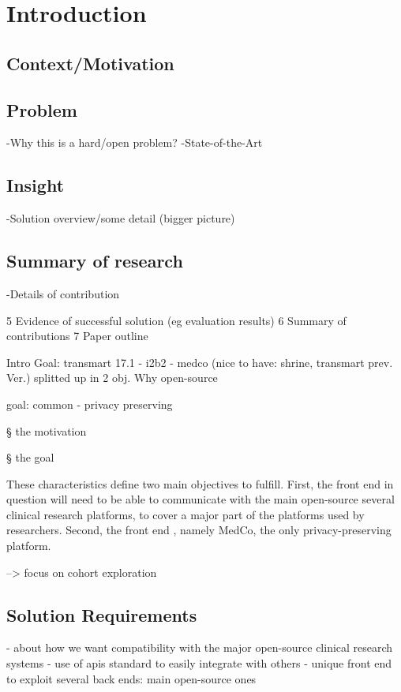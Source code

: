 \chapter{Introduction}
\section{Context/Motivation}


\section{Problem}
-Why this is a hard/open problem?
-State-of-the-Art

\section{Insight}
-Solution overview/some detail (bigger picture)

\section{Summary of research}
-Details of contribution

5 Evidence of successful solution (eg evaluation results)
6 Summary of contributions
7 Paper outline

Intro
Goal: transmart 17.1 - i2b2 - medco (nice to have: shrine, transmart prev. Ver.)
splitted up in 2 obj.
Why open-source

goal: common - privacy preserving

§ the motivation

§ the goal

These characteristics define two main objectives to fulfill. 
First, the front end in question will need to be able to communicate with the main open-source several clinical research platforms, to cover a major part of the platforms used by researchers.
Second, the front end , namely MedCo, the only privacy-preserving platform.

--> focus on cohort exploration

\section{Solution Requirements}
\label{sec:requirements}
- about how we want compatibility with the major open-source clinical research systems
- use of apis standard to easily integrate with others
- unique front end to exploit several back ends: main open-source ones